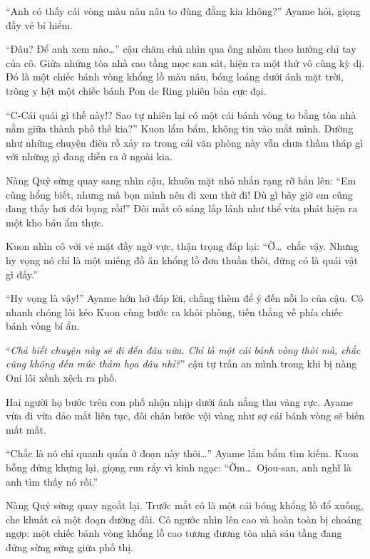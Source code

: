 \documentclass[../main.tex]{subfiles}
\begin{document}

``Anh có thấy cái vòng màu nâu nâu to đùng đằng kia không?'' Ayame hỏi, giọng đầy vẻ bí hiểm.

``Đâu? Để anh xem nào\dots'' cậu chăm chú nhìn qua ống nhòm theo hướng chỉ tay của cô. Giữa những tòa nhà cao tầng mọc san sát, hiện ra một thứ vô cùng kỳ dị. Đó là một chiếc bánh vòng khổng lồ màu nâu, bóng loáng dưới ánh mặt trời, trông y hệt một chiếc bánh Pon de Ring phiên bản cực đại.

``C-Cái quái gì thế này!? Sao tự nhiên lại có một cái bánh vòng to bằng tòa nhà nằm giữa thành phố thế kia?'' Kuon lẩm bẩm, không tin vào mắt mình. Dường như những chuyện điên rồ xảy ra trong cái văn phòng này vẫn chưa thấm tháp gì với những gì đang diễn ra ở ngoài kia.

Nàng Quỷ sừng quay sang nhìn cậu, khuôn mặt nhỏ nhắn rạng rỡ hẳn lên: ``Em cũng hổng biết, nhưng mà bọn mình nên đi xem thử đi! Dù gì bây giờ em cũng đang thấy hơi đói bụng rồi!'' Đôi mắt cô sáng lấp lánh như thể vừa phát hiện ra một kho báu ẩm thực.

Kuon nhìn cô với vẻ mặt đầy ngờ vực, thận trọng đáp lại: ``Ờ\dots\ chắc vậy. Nhưng hy vọng nó chỉ là một miếng đồ ăn khổng lồ đơn thuần thôi, đừng có là quái vật gì đấy.''

``Hy vọng là vậy!'' Ayame hớn hở đáp lời, chẳng thèm để ý đến nỗi lo của cậu. Cô nhanh chóng lôi kéo Kuon cùng bước ra khỏi phòng, tiến thẳng về phía chiếc bánh vòng bí ẩn.

``\textit{Chả biết chuyện này sẽ đi đến đâu nữa. Chỉ là một cái bánh vòng thôi mà, chắc cũng không đến mức thảm họa đâu nhỉ?}'' cậu tự trấn an mình trong khi bị nàng Oni lôi xềnh xệch ra phố.

\ct

Hai người họ bước trên con phố nhộn nhịp dưới ánh nắng thu vàng rực. Ayame vừa đi vừa đảo mắt liên tục, đôi chân bước vội vàng như sợ cái bánh vòng sẽ biến mất mất.

``Chắc là nó chỉ quanh quẩn ở đoạn này thôi\dots'' Ayame lẩm bẩm tìm kiếm.
Kuon bỗng đứng khựng lại, giọng run rẩy vì kinh ngạc: ``Ờm\dots\ Ojou-san, anh nghĩ là anh tìm thấy nó rồi.''

Nàng Quỷ sừng quay ngoắt lại. Trước mắt cô là một cái bóng khổng lồ đổ xuống, che khuất cả một đoạn đường dài. Cô ngước nhìn lên cao và hoàn toàn bị choáng ngợp: một chiếc bánh vòng khổng lồ cao tương đương tòa nhà sáu tầng đang đứng sừng sững giữa phố thị.

\end{document}
